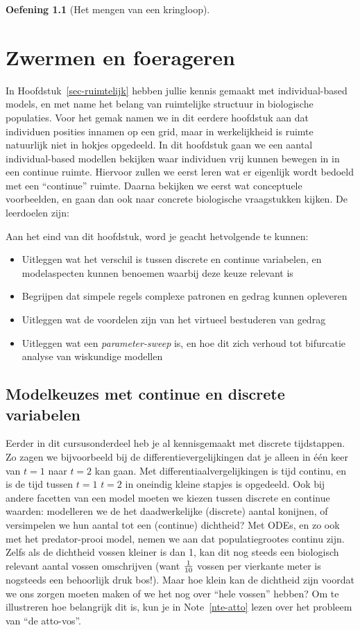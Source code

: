 \documentclass[
  a4paper,
]{scrbook}
\providecommand{\tightlist}{%
  \setlength{\itemsep}{0pt}\setlength{\parskip}{0pt}}\usepackage{longtable,booktabs,array}
\theoremstyle{definition}
\newtheorem{exercise}{Oefening}[chapter]
\theoremstyle{remark}
\begin{document}
\begin{exercise}[Het mengen van een
kringloop]
\chapter{Zwermen en foerageren}\label{zwermen-en-foerageren}

In Hoofdstuk~\ref{sec-ruimtelijk} hebben jullie kennis gemaakt met
individual-based models, en met name het belang van ruimtelijke
structuur in biologische populaties. Voor het gemak namen we in dit
eerdere hoofdstuk aan dat individuen posities innamen op een grid, maar
in werkelijkheid is ruimte natuurlijk niet in hokjes opgedeeld. In dit
hoofdstuk gaan we een aantal individual-based modellen bekijken waar
individuen vrij kunnen bewegen in in een continue ruimte. Hiervoor
zullen we eerst leren wat er eigenlijk wordt bedoeld met een
``continue'' ruimte. Daarna bekijken we eerst wat conceptuele
voorbeelden, en gaan dan ook naar concrete biologische vraagstukken
kijken. De leerdoelen zijn:

Aan het eind van dit hoofdstuk, word je geacht hetvolgende te kunnen:

\begin{itemize}
\tightlist
\item
  Uitleggen wat het verschil is tussen discrete en continue variabelen,
  en modelaspecten kunnen benoemen waarbij deze keuze relevant is
\item
  Begrijpen dat simpele regels complexe patronen en gedrag kunnen
  opleveren
\item
  Uitleggen wat de voordelen zijn van het virtueel bestuderen van gedrag
\item
  Uitleggen wat een \emph{parameter-sweep} is, en hoe dit zich verhoud
  tot bifurcatie analyse van wiskundige modellen
\end{itemize}

\section{Modelkeuzes met continue en discrete
variabelen}\label{modelkeuzes-met-continue-en-discrete-variabelen}

Eerder in dit cursusonderdeel heb je al kennisgemaakt met discrete
tijdstappen. Zo zagen we bijvoorbeeld bij de differentievergelijkingen
dat je alleen in één keer van \(t=1\) naar \(t=2\) kan gaan. Met
differentiaalvergelijkingen is tijd continu, en is de tijd tussen
\(t=1\) \(t=2\) in oneindig kleine stapjes is opgedeeld. Ook bij andere
facetten van een model moeten we kiezen tussen discrete en continue
waarden: modelleren we de het daadwerkelijke (discrete) aantal konijnen,
of versimpelen we hun aantal tot een (continue) dichtheid? Met ODEs, en
zo ook met het predator-prooi model, nemen we aan dat populatiegrootes
continu zijn. Zelfs als de dichtheid vossen kleiner is dan 1, kan dit
nog steeds een biologisch relevant aantal vossen omschrijven (want
\(1 \over 10\) vossen per vierkante meter is nogsteeds een behoorlijk
druk bos!). Maar hoe klein kan de dichtheid zijn voordat we ons zorgen
moeten maken of we het nog over ``hele vossen'' hebben? Om te
illustreren hoe belangrijk dit is, kun je in Note~\ref{nte-atto} lezen
over het probleem van ``de atto-vos''.


\end{exercise}
\end{document}

